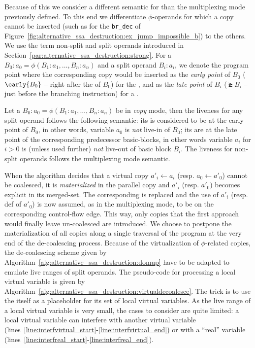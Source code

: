 Because of this we consider a different semantic for \phifuns than the multiplexing mode previously defined. 
To this end we differentiate $\phi$-operands for which a copy cannot be inserted (such as for the \texttt{br\_dec} of Figure~\ref{fig:alternative_ssa_destruction:ex_jump_impossible_b}) to the others. 
We use the term non-split and split operands introduced in Section~\ref{par:alternative_ssa_destruction:strong}. 
For a \phifun $B_0:a_0=\phi(B_1:a_1,\dots,B_n:a_n)$ and a split operand $B_i:a_i$, we denote the program point where the corresponding copy would be inserted as the \emph{early point} of $B_0$ ($\early{B_0}$ -- right after the \phifuns of $B_0$) for the , and as the \emph{late point} of $B_i$ ($\late{B_i}$ -- just before the branching instruction) for a \useop.
\begin{definition}
Let a \phifun $B_0:a_0=\phi(B_1:a_1,\dots,B_n:a_n)$ be in \emph{copy} mode, then the liveness for any split operand follows the following semantic: its  is considered to be at the early point of $B_0$, in other words, variable $a_0$ is \emph{not} live-in of $B_0$; its \useops are at the late point of the corresponding predecessor basic-blocks, in other words variable $a_i$ for $i>0$ is (unless used further) \emph{not} live-out of basic block $B_i$. The liveness for non-split operands follows the multiplexing mode semantic. 
\end{definition}

When the algorithm decides that a virtual copy $a'_i \gets a_i$ (resp. 
$a_0 \gets a'_0$) cannot be coalesced, it is \emph{materialized} in the parallel copy and $a'_i$ (resp. 
$a'_0$) becomes explicit in its merged-set. 
The corresponding \phiop is replaced and the use of $a'_i$ (resp. 
def of $a'_0$) is now assumed, as in the multiplexing mode, to be on the corresponding control-flow edge. 
This way, only copies that the first approach would finally leave un-coalesced are introduced. 
We choose to postpone the materialization of all copies along a single traversal of the program at the very end of the de-coalescing process. 
Because of the virtualization of $\phi$-related copies, the de-coalescing scheme given by Algorithm~\ref{alg:alternative_ssa_destruction:domup} have to be adapted to emulate live ranges of split operands. 
The pseudo-code for processing a local virtual variable is given by Algorithm~\ref{alg:alternative_ssa_destruction:virtualdecoalesce}. 
The trick is to use the \phifun itself as a placeholder for its set of local virtual variables. 
As the live range of a local virtual variable is very small, the cases to consider are quite limited: 
a local virtual variable can interfere with another virtual variable (lines~\ref{line:interfvirtual_start}-\ref{line:interfvirtual_end}) or with a ``real'' variable (lines~\ref{line:interfreal_start}-\ref{line:interfreal_end}).

